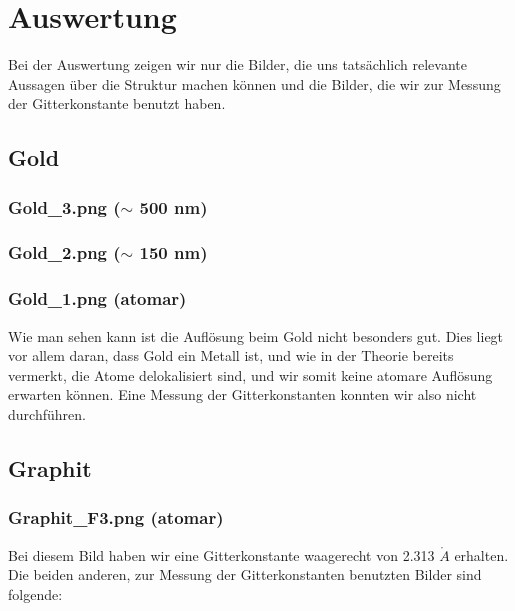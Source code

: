 \section{Auswertung}

Bei der Auswertung zeigen wir nur die Bilder, die uns tatsächlich relevante Aussagen über die Struktur machen können und die Bilder, die wir zur Messung der Gitterkonstante benutzt haben.

\subsection{Gold}

\subsubsection{Gold\_3.png ($\sim$ 500 nm)}
\subsubsection{Gold\_2.png ($\sim$ 150 nm)}
\subsubsection{Gold\_1.png (atomar)}

Wie man sehen kann ist die Auflösung beim Gold nicht besonders gut. Dies liegt vor allem daran, dass Gold ein Metall ist, und wie in der Theorie bereits vermerkt, die Atome delokalisiert sind, und wir somit keine atomare Auflösung erwarten können. Eine Messung der Gitterkonstanten konnten wir also nicht durchführen.

\subsection{Graphit}

\subsubsection{Graphit\_F3.png (atomar)}

Bei diesem Bild haben wir eine Gitterkonstante waagerecht von 2.313 $\mathring{A}$ erhalten. Die beiden anderen, zur Messung der Gitterkonstanten benutzten Bilder sind folgende:



